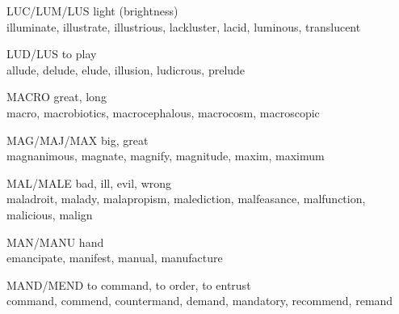 \begin{flashcard}[Roots]{LUC/LUM/LUS}
light (brightness)\\
\vspace{0.2in}
illuminate, illustrate, illustrious, lackluster, lacid, luminous, translucent\\
\end{flashcard}

\begin{flashcard}[Roots]{LUD/LUS}
to play\\
\vspace{0.2in}
allude, delude, elude, illusion, ludicrous, prelude\\
\end{flashcard}

\begin{flashcard}[Roots]{MACRO}
great, long\\
\vspace{0.2in}
macro, macrobiotics, macrocephalous, macrocosm, macroscopic\\
\end{flashcard}

\begin{flashcard}[Roots]{MAG/MAJ/MAX}
big, great\\
\vspace{0.2in}
magnanimous, magnate, magnify, magnitude, maxim, maximum\\
\end{flashcard}

\begin{flashcard}[Roots]{MAL/MALE}
bad, ill, evil, wrong\\
\vspace{0.2in}
maladroit, malady, malapropism, malediction, malfeasance, malfunction, malicious, malign\\
\end{flashcard}

\begin{flashcard}[Roots]{MAN/MANU}
hand\\
\vspace{0.2in}
emancipate, manifest, manual, manufacture\\
\end{flashcard}

\begin{flashcard}[Roots]{MAND/MEND}
to command, to order, to entrust\\
\vspace{0.2in}
command, commend, countermand, demand, mandatory, recommend, remand\\
\end{flashcard}

